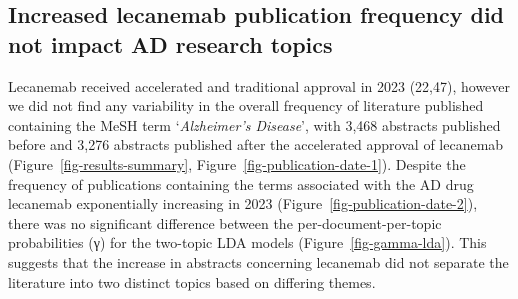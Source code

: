 \documentclass[
  a4paper,
]{article}
\begin{document}
\hypertarget{increased-lecanemab-publication-frequency-did-not-impact-ad-research-topics}{%
\subsection{Increased lecanemab publication frequency did not impact AD
research
topics}\label{increased-lecanemab-publication-frequency-did-not-impact-ad-research-topics}}

Lecanemab received accelerated and traditional approval in 2023 (22,47),
however we did not find any variability in the overall frequency of
literature published containing the MeSH term `\emph{Alzheimer's
Disease}', with 3,468 abstracts published before and 3,276 abstracts
published after the accelerated approval of lecanemab
(Figure~\ref{fig-results-summary}, Figure~\ref{fig-publication-date-1}).
Despite the frequency of publications containing the terms associated
with the AD drug lecanemab exponentially increasing in 2023
(Figure~\ref{fig-publication-date-2}), there was no significant
difference between the per-document-per-topic probabilities (γ) for the
two-topic LDA models (Figure~\ref{fig-gamma-lda}). This suggests that
the increase in abstracts concerning lecanemab did not separate the
literature into two distinct topics based on differing themes.
\end{document}

